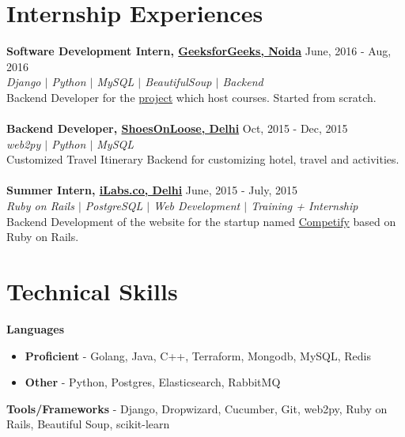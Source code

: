\documentclass[margin, centered]{res}
\begin{document}
\begin{resume}
\section{Internship Experiences}
\textbf{Software Development Intern, \href{http://www.geeksforgeeks.org}{GeeksforGeeks, Noida}} \hfill June, 2016 - Aug, 2016\\
\emph{\color{BlueViolet}Django $\vert$ Python $\vert$ MySQL $\vert$ BeautifulSoup $\vert$ Backend}  \\
Backend Developer for the \href{http://courses.geeksforgeeks.org}{project} which host courses. Started from scratch.  \\
\\
\textbf{Backend Developer, \href {http://shoesonloose.com/}{ShoesOnLoose, Delhi}} \hfill Oct, 2015 - Dec, 2015 \\
\emph{\color{BlueViolet}web2py $\vert$ Python $\vert$ MySQL} \\
Customized Travel Itinerary Backend for customizing hotel, travel and activities. \\
\\
\textbf{Summer Intern, \href{http://www.ilabs.co}{iLabs.co, Delhi}} \hfill June, 2015 - July, 2015 \\
\emph{\color{BlueViolet}Ruby on Rails $\vert$ PostgreSQL $\vert$ Web Development $\vert$ Training + Internship} \\
Backend Development of the website for the startup named \href {http://competifyin.herokuapp.com} {Competify} based on Ruby on Rails. 
\section{Technical \hspace{2mm} Skills}
\textbf{Languages}
\begin{itemize}
	\item \textbf{Proficient} - Golang, Java, C++, Terraform, Mongodb, MySQL, Redis
	\item \textbf{Other} -  Python, Postgres, Elasticsearch, RabbitMQ
\end{itemize}
\textbf{Tools/Frameworks} - Django, Dropwizard, Cucumber, Git, web2py, Ruby on Rails, Beautiful Soup, scikit-learn


\end{resume}
\end{document}
